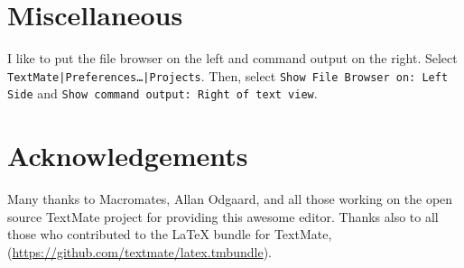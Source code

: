 \documentclass[10pt]{article}
\begin{document}
\section{Miscellaneous} %
\label{sec:miscellaneous}
I like to put the file browser on the left and command output on the right.
Select \texttt{TextMate|Preferences\dots|Projects}.
Then, select \texttt{Show File Browser on: Left Side} and
\texttt{Show command output: Right of text view}.



\section*{Acknowledgements} %
\label{sec:acknowledgements}

Many thanks to Macromates, Allan Odgaard, and all those working 
on the open source TextMate project for providing this awesome editor.
Thanks also to all those who contributed to the \LaTeX{} bundle for TextMate,
(\url{https://github.com/textmate/latex.tmbundle}).

\end{document}
